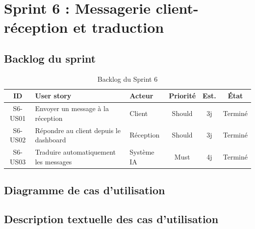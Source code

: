 \section{Sprint 6 : Messagerie client-réception et traduction}
\label{sec:sprint6}

\subsection{Backlog du sprint}
\begin{table}[H]
\centering
\caption{Backlog du Sprint 6}
\small
\begin{tabularx}{\textwidth}{|c|X|p{2.2cm}|c|c|c|}
\hline
\textbf{ID} & \textbf{User story} & \textbf{Acteur} & \textbf{Priorité} & \textbf{Est.} & \textbf{État} \\ \hline
S6-US01 & Envoyer un message à la réception & Client & Should & 3j & Terminé \\ \hline
S6-US02 & Répondre au client depuis le dashboard & Réception & Should & 3j & Terminé \\ \hline
S6-US03 & Traduire automatiquement les messages & Système IA & Must & 4j & Terminé \\ \hline
\end{tabularx}
\end{table}

\subsection{Diagramme de cas d'utilisation}

\subsection{Description textuelle des cas d'utilisation}

